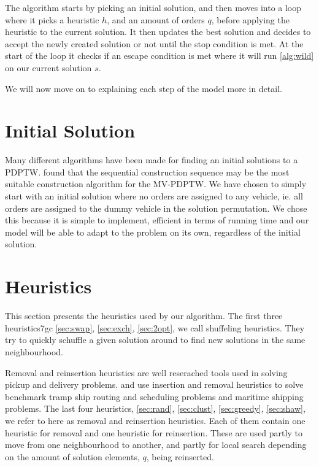 \documentclass[../main.tex]{subfiles}
\begin{document}
The algorithm starts by picking an initial solution, and then moves into a loop where it picks a heuristic $h$, and an amount of orders $q$, before applying the heuristic to the current solution. 
It then updates the best solution and decides to accept the newly created solution or not until the stop condition is met.
At the start of the loop it checks if an escape condition is met where it will run \cref{alg:wild} on our current solution $s$. \par
We will now move on to explaining each step of the model more in detail.

\section{Initial Solution}
\label{sec:init}
Many different algorithms have been made for finding an initial solutions to a PDPTW. \cite{hosny12} found that the sequential construction sequence may be the most suitable construction algorithm for the MV-PDPTW. 
We have chosen to simply start with an initial solution where no orders are assigned to any vehicle, ie. all orders are assigned to the dummy vehicle in the solution permutation. 
We chose this because it is simple to implement, efficient in terms of running time and our model will be able to adapt to the problem on its own, regardless of the initial solution.

\section{Heuristics}
\label{sec:heur}
This section presents the heuristics used by our algorithm.
The first three heuristics7gc \ref{sec:swap}, \ref{sec:exch}, \ref{sec:2opt}, we call shuffeling heuristics. They try to quickly schuffle a given solution around to find new solutions in the same neighbourhood. \par

Removal and reinsertion heuristics are well reserached tools used in solving pickup and delivery problems. \cite{hemmati14} and \cite{hemmati16} use insertion and removal heuristics to solve benchmark tramp ship routing and scheduling problems and maritime shipping problems.
The last four heuristics, \ref{sec:rand}, \ref{sec:clust}, \ref{sec:greedy}, \ref{sec:shaw}, we refer to here as removal and reinsertion heuristics. Each of them contain one heuristic for removal and one heuristic for reinsertion.
These are used partly to move from one neighbourhood to another, and partly for local search depending on the amount of solution elements, $q$, being reinserted.  
\end{document}
